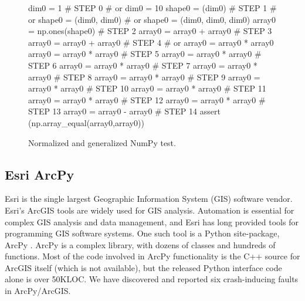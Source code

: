 \begin{figure}
{\scriptsize
\begin{code}
dim0 = 1                            \textcolor{black!60}{\# STEP 0}
\textcolor{black!60}{\#  or dim0 = 10 }
shape0 = (dim0)                     \textcolor{black!60}{\# STEP 1}
\textcolor{black!60}{\#  or shape0 = (dim0, dim0) }
\textcolor{black!60}{\#  or shape0 = (dim0, dim0, dim0) }
array0 = np.ones(shape0)            \textcolor{black!60}{\# STEP 2}
array0 = array0 + array0            \textcolor{black!60}{\# STEP 3}
array0 = array0 + array0            \textcolor{black!60}{\# STEP 4}
\textcolor{black!60}{\#  or array0 = array0 * array0 }
array0 = array0 * array0            \textcolor{black!60}{\# STEP 5}
array0 = array0 * array0            \textcolor{black!60}{\# STEP 6}
array0 = array0 * array0            \textcolor{black!60}{\# STEP 7}
array0 = array0 * array0            \textcolor{black!60}{\# STEP 8}
array0 = array0 * array0            \textcolor{black!60}{\# STEP 9}
array0 = array0 * array0            \textcolor{black!60}{\# STEP 10}
array0 = array0 * array0            \textcolor{black!60}{\# STEP 11}
array0 = array0 * array0            \textcolor{black!60}{\# STEP 12}
array0 = array0 * array0            \textcolor{black!60}{\# STEP 13}
array0 = array0 - array0            \textcolor{black!60}{\# STEP 14}
assert (np.array\_equal(array0,array0))
\end{code}
}
\caption{Normalized and generalized NumPy test.}
\label{numpynormgen}
\end{figure}

\subsection{Esri ArcPy}

Esri is the single
largest Geographic Information System (GIS) software vendor.  Esri's ArcGIS tools are widely
used for GIS analysis.  Automation is essential for complex GIS analysis and
data management, and Esri has long provided tools
for programming GIS software systems.  One such tool
is a Python site-package, ArcPy \cite{ArcPy}.  ArcPy is a complex library,
with dozens of classes and hundreds of functions.  Most of the code involved in ArcPy
functionality is the C++ source for ArcGIS itself (which is not
available), but the released Python interface code alone is over 50KLOC.
We have  discovered and reported six crash-inducing faults in
ArcPy/ArcGIS.  

